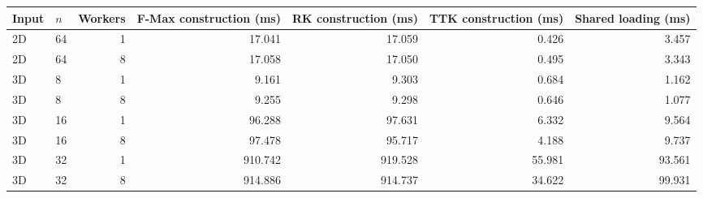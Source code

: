\begin{tabular}{llrrrrr}
\hline
Input & $n$ & Workers & F-Max construction (ms) & RK construction (ms) & TTK construction (ms) & Shared loading (ms) \\
\hline
2D & 64 & 1 & 17.041 & 17.059 & 0.426 & 3.457 \\
2D & 64 & 8 & 17.058 & 17.050 & 0.495 & 3.343 \\
3D & 8 & 1 & 9.161 & 9.303 & 0.684 & 1.162 \\
3D & 8 & 8 & 9.255 & 9.298 & 0.646 & 1.077 \\
3D & 16 & 1 & 96.288 & 97.631 & 6.332 & 9.564 \\
3D & 16 & 8 & 97.478 & 95.717 & 4.188 & 9.737 \\
3D & 32 & 1 & 910.742 & 919.528 & 55.981 & 93.561 \\
3D & 32 & 8 & 914.886 & 914.737 & 34.622 & 99.931 \\
\hline
\end{tabular}
